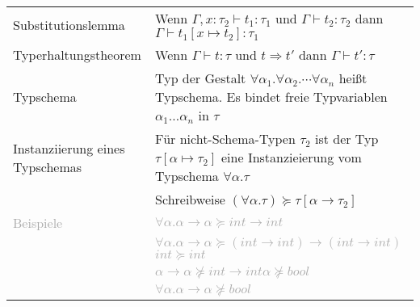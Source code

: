 \documentclass{Zusammenfassung}
\begin{document}
\begin{table}[H]
    \centering
    \begin{tabularx}{\textwidth}{lX}
        Substitutionslemma & Wenn $\Gamma,x:\tau_2\vdash{}t_1:\tau_1$ und $\Gamma\vdash{}t_2:\tau_2$ dann $\Gamma\vdash{}t_1[x\mapsto{}t_2]:\tau_1$\\
        Typerhaltungstheorem & Wenn $\Gamma\vdash{}t:\tau$ und $t\Rightarrow{}t'$ dann $\Gamma\vdash{}t':\tau$\\
        Typschema & Typ der Gestalt $\forall\alpha_1.\forall\alpha_2.\cdots\forall\alpha_n$ heißt Typschema.
        Es bindet freie Typvariablen $\alpha_1\dots\alpha_n$ in $\tau$\\
        Instanziierung eines Typschemas & Für nicht-Schema-Typen $\tau_2$ ist der Typ $\tau[\alpha\mapsto\tau_2]$ eine Instanzieierung vom Typschema $\forall\alpha.\tau$\\
        &Schreibweise $(\forall\alpha.\tau)\succeq\tau[\alpha\rightarrow\tau_2]$\\
        \textcolor{darkgray}{Beispiele} & \textcolor{darkgray}{$\forall\alpha.\alpha\rightarrow\alpha\succeq{}int\rightarrow{}int$}\\
        &\textcolor{darkgray}{$\forall\alpha.\alpha\rightarrow\alpha\succeq{}(int\rightarrow{}int)\rightarrow(int\rightarrow{}int)$\quad$int\succeq{}int$}\\
        &\textcolor{darkgray}{$\alpha\rightarrow\alpha\nsucceq{}int\rightarrow{}int$\quad$\alpha\nsucceq{}bool$}\\
        &\textcolor{darkgray}{$\forall\alpha.\alpha\rightarrow\alpha\nsucceq{}bool$}\\
    \end{tabularx}
    \label{tab:3}
\end{table}
\end{document}
